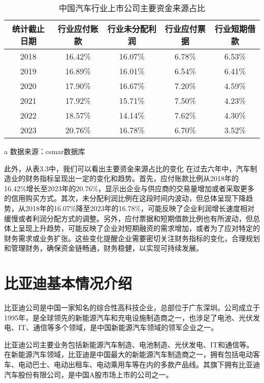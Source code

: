 \begin{table}
  \centering
  \begin{threeparttable}[c]
    \caption{中国汽车行业上市公司主要资金来源占比}
    \label{tab:cash-sources-rates}
    \begin{tabular}{ccccc}
      \toprule
         统计截止日期 & 行业应付账款 & 行业未分配利润 & 行业应付票据 & 行业短期借款 \\ 
      \midrule
        2018 & 16.42\% & 16.07\% & 6.78\% & 6.53\% \\ 
        2019 & 16.89\% & 16.01\% & 6.54\% & 6.41\% \\ 
        2020 & 17.90\% & 16.67\% & 7.20\% & 4.59\% \\
        2021 & 17.92\% & 15.71\% & 7.50\% & 4.23\% \\ 
        2022 & 18.57\% & 14.14\% & 7.62\% & 4.30\% \\ 
        2023 & 20.76\% & 16.78\% & 6.70\% & 3.52\% \\ 
      \bottomrule
    \end{tabular}
    \begin{tablenotes}
      \item [a] 数据来源：csmar数据库
    \end{tablenotes}
  \end{threeparttable}
\end{table}
此外，从表3.3中，我们可以看出主要资金来源占比的变化 在过去六年中，汽车制造业的财务指标呈现出一定的变化和趋势。首先，应付账款比例从2018年的16.42\%增长至2023年的20.76\%，显示出企业与供应商的交易量增加或者采取更多的信用购买方式。其次，未分配利润比例在这段时间内波动，但总体呈现下降趋势，从2018年的16.07\%降至2023年的16.78\%，可能反映了企业利润增长速度相对缓慢或者利润分配方式的调整。另外，应付票据和短期借款比例也有所波动，但总体上呈现上升趋势，可能反映了企业对短期融资的需求增加，或者为了应对特定的财务需求或业务扩张。这些变化提醒企业需要密切关注财务指标的变化，合理规划和管理财务，确保资金链畅通，财务稳健，以实现可持续发展。
\section{比亚迪基本情况介绍}
比亚迪公司是中国一家知名的综合性高科技企业，总部位于广东深圳。公司成立于1995年，是全球领先的新能源汽车和充电设施制造商之一，也涉足了电池、光伏发电、IT、通信等多个领域，是中国新能源汽车领域的领军企业之一。

比亚迪公司主要业务包括新能源汽车制造、电池制造、光伏发电、IT和通信等。在新能源汽车领域，比亚迪是中国最大的新能源汽车制造商之一，拥有包括电动客车、电动巴士、电动出租车、电动乘用车等在内的多款产品线。其旗下拥有比亚迪汽车股份有限公司，是中国A股市场上市的公司之一。

